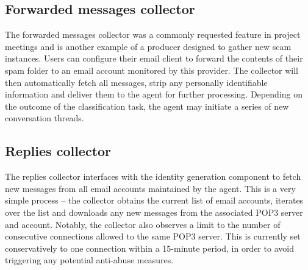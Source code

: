 \subsection{Forwarded messages collector}
The forwarded messages collector was a commonly requested feature in project meetings and is another example of a producer designed to gather new scam instances. Users can configure their email client to forward the contents of their spam folder to an email account monitored by this provider. The collector will then automatically fetch all messages, strip any personally identifiable information and deliver them to the agent for further processing. Depending on the outcome of the classification task, the agent may initiate a series of new conversation threads.

\subsection{Replies collector}
The replies collector interfaces with the identity generation component to fetch new messages from all email accounts maintained by the agent. This is a very simple process -- the collector obtains the current list of email accounts, iterates over the list and downloads any new messages from the associated POP3 server and account.  Notably, the collector also observes a limit to the number of consecutive connections allowed to the same POP3 server. This is currently set conservatively to one connection within a 15-minute period, in order to avoid triggering any potential anti-abuse measures.
